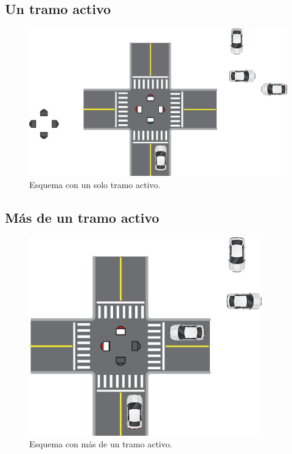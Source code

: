 \subsection{Un tramo activo}
\begin{figure}[htbp]
	\centering
	\includegraphics[width=1.2\textwidth]{diagramas/un-activo.eps}
	\caption{Esquema con un solo tramo activo.}
	\label{fig:un-activo}
\end{figure}

\subsection{Más de un tramo activo}
\begin{figure}[htbp]
	\centering
	\includegraphics[width=0.9\textwidth]{diagramas/dos-activos.eps}
	\caption{Esquema con más de un tramo activo.}
	\label{fig:dos-activos}
\end{figure}

